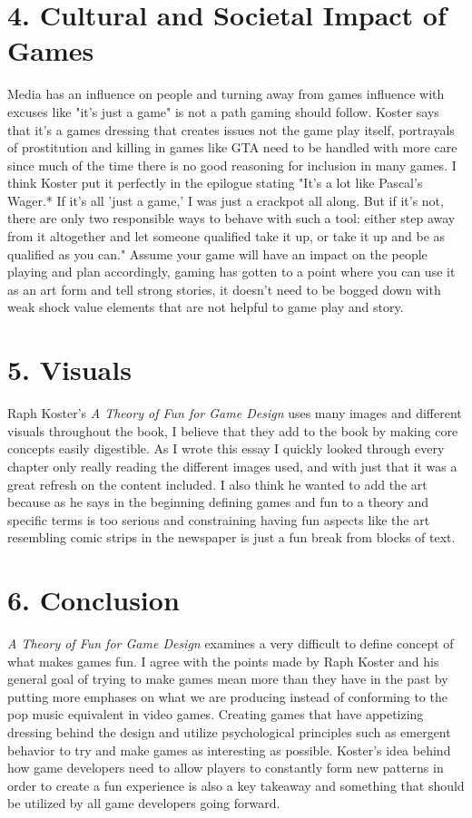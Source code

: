 \documentclass[12pt]{article}
\theoremstyle{definition}
\begin{document}
\section*{4. Cultural and Societal Impact of Games}
Media has an influence on people and turning away from games influence with excuses like "it's just a game" is not a path gaming should follow. Koster says that it's a games dressing that creates issues not the game play itself, portrayals of prostitution and killing in games like GTA need to be handled with more care since much of the time there is no good reasoning for inclusion in many games. I think Koster put it perfectly in the epilogue stating "It’s a lot like Pascal’s Wager.* If it’s all 'just a game,' I was just a crackpot all along. But if it’s not, there are only two responsible ways to behave with such a tool: either step away from it altogether and let someone qualified take it up, or take it up and be as qualified as you can." Assume your game will have an impact on the people playing and plan accordingly, gaming has gotten to a point where you can use it as an art form and tell strong stories, it doesn't need to be bogged down with weak shock value elements that are not helpful to game play and story.

\section*{5. Visuals}
Raph Koster’s \textit{A Theory of Fun for Game Design} uses many images and different visuals throughout the book, I believe that they add to the book by making core concepts easily digestible. As I wrote this essay I quickly looked through every chapter only really reading the different images used, and with just that it was a great refresh on the content included. I also think he wanted to add the art because as he says in the beginning defining games and fun to a theory and specific terms is too serious and constraining having fun aspects like the art resembling comic strips in the newspaper is just a fun break from blocks of text.

\section*{6. Conclusion}
\textit{A Theory of Fun for Game Design} examines a very difficult to define concept of what makes games fun. I agree with the points made by Raph Koster and his general goal of trying to make games mean more than they have in the past by putting more emphases on what we are producing instead of conforming to the pop music equivalent in video games. Creating games that have appetizing dressing behind the design and utilize psychological principles such as emergent behavior to try and make games as interesting as possible. Koster's idea behind how game developers need to allow players to constantly form new patterns in order to create a fun experience is also a key takeaway and something that should be utilized by all game developers going forward.
\end{document}

